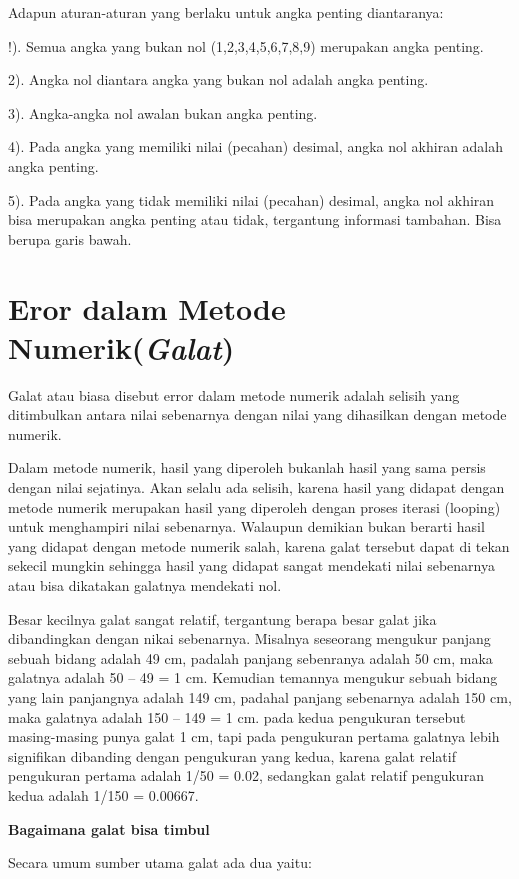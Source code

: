 \documentclass{article}
\begin{document}
Adapun aturan-aturan yang berlaku untuk angka penting diantaranya:

!). Semua angka yang bukan nol (1,2,3,4,5,6,7,8,9) merupakan angka penting.

2). Angka nol diantara angka yang bukan nol adalah angka penting.

3). Angka-angka nol awalan bukan angka penting.

4). Pada angka yang memiliki nilai (pecahan) desimal, angka nol akhiran adalah angka penting.

5). Pada angka yang tidak memiliki nilai (pecahan) desimal, angka nol akhiran bisa merupakan angka penting atau tidak, tergantung informasi tambahan. Bisa berupa garis bawah.

\section*{Eror dalam Metode Numerik(\textit{Galat})}

Galat atau biasa disebut error dalam metode numerik adalah selisih yang ditimbulkan antara nilai sebenarnya dengan nilai yang dihasilkan dengan metode numerik.

Dalam metode numerik, hasil yang diperoleh bukanlah hasil yang sama persis dengan nilai sejatinya. Akan selalu ada selisih, karena hasil yang didapat dengan metode numerik merupakan hasil yang diperoleh dengan proses iterasi (looping) untuk menghampiri nilai sebenarnya. Walaupun demikian bukan berarti hasil yang didapat dengan metode numerik salah, karena galat tersebut dapat di tekan sekecil mungkin sehingga hasil yang didapat sangat mendekati nilai sebenarnya atau bisa dikatakan galatnya mendekati nol.

Besar kecilnya galat sangat relatif, tergantung berapa besar galat jika dibandingkan dengan nikai sebenarnya. Misalnya seseorang mengukur panjang sebuah bidang adalah 49 cm, padalah panjang sebenranya adalah 50 cm, maka galatnya adalah 50 – 49 =  1 cm. Kemudian temannya mengukur sebuah bidang yang lain panjangnya adalah 149 cm, padahal panjang sebenarnya adalah 150 cm, maka galatnya adalah 150 – 149 = 1 cm. pada kedua pengukuran tersebut masing-masing punya galat 1 cm, tapi pada pengukuran pertama galatnya lebih signifikan dibanding dengan pengukuran yang kedua, karena galat relatif pengukuran pertama adalah 1/50 = 0.02, sedangkan galat relatif pengukuran kedua adalah 1/150 = 0.00667.

\textbf{Bagaimana galat bisa timbul}

Secara umum sumber utama galat ada dua yaitu:
\end{document}
